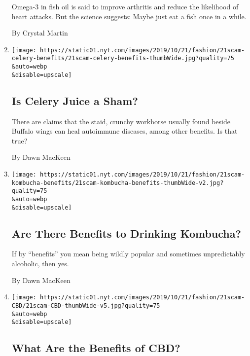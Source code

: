 \begin{enumerate}
  Omega-3 in fish oil is said to improve arthritis and reduce the
  likelihood of heart attacks. But the science suggests: Maybe just eat
  a fish once in a while.

  By Crystal Martin
\item
  \href{/2019/10/16/style/self-care/celery-juice-benefits.html}{}

  \texttt{[image: https://static01.nyt.com/images/2019/10/21/fashion/21scam-celery-benefits/21scam-celery-benefits-thumbWide.jpg?quality=75\\\&auto=webp\\\&disable=upscale]}

  \hypertarget{is-celery-juice-a-sham}{%
  \subsection{Is Celery Juice a Sham?}\label{is-celery-juice-a-sham}}

  There are claims that the staid, crunchy workhorse usually found
  beside Buffalo wings can heal autoimmune diseases, among other
  benefits. Is that true?

  By Dawn MacKeen
\item
  \href{/2019/10/16/style/self-care/kombucha-benefits.html}{}

  \texttt{[image: https://static01.nyt.com/images/2019/10/21/fashion/21scam-kombucha-benefits/21scam-kombucha-benefits-thumbWide-v2.jpg?quality=75\\\&auto=webp\\\&disable=upscale]}

  \hypertarget{are-there-benefits-to-drinking-kombucha}{%
  \subsection{Are There Benefits to Drinking
  Kombucha?}\label{are-there-benefits-to-drinking-kombucha}}

  If by ``benefits'' you mean being wildly popular and sometimes
  unpredictably alcoholic, then yes.

  By Dawn MacKeen
\item
  \href{/2019/10/16/style/self-care/cbd-oil-benefits.html}{}

  \texttt{[image: https://static01.nyt.com/images/2019/10/21/fashion/21scam-CBD/21scam-CBD-thumbWide-v5.jpg?quality=75\\\&auto=webp\\\&disable=upscale]}

  \hypertarget{what-are-the-benefits-of-cbd}{%
  \subsection{What Are the Benefits of
  CBD?}\label{what-are-the-benefits-of-cbd}}


\end{enumerate}
